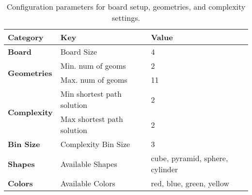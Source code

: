 \begin{table*}[h]
    \caption{Configuration parameters for board setup, geometries, and complexity settings.}
    \centering
    \renewcommand{\arraystretch}{1.2} %
    \begin{tabularx}{\textwidth}{p{5cm} p{4cm} X} 
        \toprule
        \textbf{Category} & \textbf{Key} & \textbf{Value} \\
        \midrule
        \multirow{1}{*}{\textbf{Board}} 
         & Board Size & 4 \\
        \midrule
        \multirow{2}{*}{\textbf{Geometries}} 
         & Min. num of geoms & 2 \\
         & Max. num of geoms & 11 \\
        \midrule
        \multirow{2}{*}{\textbf{Complexity}} 
         & Min shortest path solution & 2 \\
         & Max shortest path solution & 2 \\
        \midrule
        \multirow{1}{*}{\textbf{Bin Size}} 
         & Complexity Bin Size & 3 \\
        \midrule
        \multirow{1}{*}{\textbf{Shapes}} 
         & Available Shapes & cube, pyramid, sphere, cylinder \\
        \midrule
        \multirow{1}{*}{\textbf{Colors}} 
         & Available Colors & red, blue, green, yellow \\
        \bottomrule
    \end{tabularx}
    \label{tab:board_params}
\end{table*}